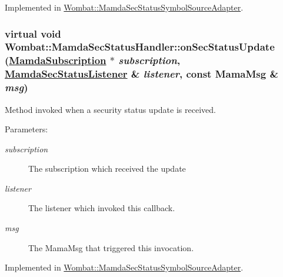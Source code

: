 Implemented in \hyperlink{classWombat_1_1MamdaSecStatusSymbolSourceAdapter_a1a7e7d772ee646d2104beb1f764efba}{Wombat::Mamda\-Sec\-Status\-Symbol\-Source\-Adapter}.\hypertarget{classWombat_1_1MamdaSecStatusHandler_db36d5defe6bca39835cca9c9732bef2}{
\subsubsection[onSecStatusUpdate]{\setlength{\rightskip}{0pt plus 5cm}virtual void Wombat::Mamda\-Sec\-Status\-Handler::on\-Sec\-Status\-Update (\hyperlink{classWombat_1_1MamdaSubscription}{Mamda\-Subscription} $\ast$ {\em subscription}, \hyperlink{classWombat_1_1MamdaSecStatusListener}{Mamda\-Sec\-Status\-Listener} \& {\em listener}, const Mama\-Msg \& {\em msg})}}
\label{classWombat_1_1MamdaSecStatusHandler_db36d5defe6bca39835cca9c9732bef2}


Method invoked when a security status update is received. 

\begin{Desc}
\item[Parameters:]
\begin{description}
\item[{\em subscription}]The subscription which received the update \item[{\em listener}]The listener which invoked this callback. \item[{\em msg}]The Mama\-Msg that triggered this invocation. \end{description}
\end{Desc}


Implemented in \hyperlink{classWombat_1_1MamdaSecStatusSymbolSourceAdapter_4671f467c1425728565861501e610ba3}{Wombat::Mamda\-Sec\-Status\-Symbol\-Source\-Adapter}.